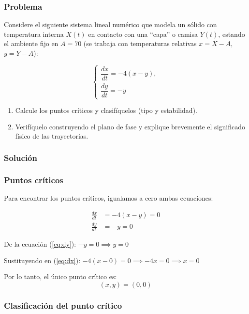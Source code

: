\documentclass[a4paper,10pt]{article}
\begin{document}
\subsubsection*{Problema}
Considere el siguiente sistema lineal numérico que modela un sólido con temperatura interna $X(t)$ en contacto con una ``capa'' o camisa $Y(t)$, estando el ambiente fijo en $A = 70$ (se trabaja con temperaturas relativas $x = X - A$, $y = Y - A$):

\begin{equation}
	\begin{cases}
		\dfrac{dx}{dt} = -4(x - y), \\
		\dfrac{dy}{dt} = -y
	\end{cases}
\end{equation}

\begin{enumerate}
	\item Calcule los puntos críticos y clasifíquelos (tipo y estabilidad).
	\item Verifíquelo construyendo el plano de fase y explique brevemente el significado físico de las trayectorias.
\end{enumerate}

\subsubsection*{Solución}

\subsubsection*{Puntos críticos}

Para encontrar los puntos críticos, igualamos a cero ambas ecuaciones:

\begin{align}
	\frac{dx}{dt} &= -4(x - y) = 0 \label{eq:dx} \\
	\frac{dy}{dt} &= -y = 0 \label{eq:dy}
\end{align}

De la ecuación (\ref{eq:dy}): $-y = 0 \implies y = 0$

Sustituyendo en (\ref{eq:dx}): $-4(x - 0) = 0 \implies -4x = 0 \implies x = 0$

Por lo tanto, el único punto crítico es:
\[
(x, y) = (0, 0)
\]

\subsubsection*{Clasificación del punto crítico}
\end{document}
